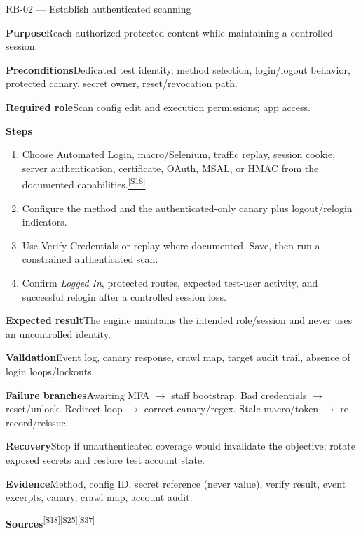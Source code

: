 \documentclass[11pt,letterpaper,oneside]{scrreprt}
\newcommand{\src}[1]{\hyperref[src:#1]{\textsuperscript{\color{R7Orange}[#1]}}}
\newcommand{\field}[1]{\par\smallskip\noindent\textbf{#1}\quad}
\begin{document}
\begin{procedure}{RB-02 --- Establish authenticated scanning}
\field{Purpose}Reach authorized protected content while maintaining a controlled session.
\field{Preconditions}Dedicated test identity, method selection, login/logout behavior, protected canary, secret owner, reset/revocation path.
\field{Required role}Scan config edit and execution permissions; app access.
\field{Steps}
\begin{enumerate}
  \item Choose Automated Login, macro/Selenium, traffic replay, session cookie, server authentication, certificate, OAuth, MSAL, or HMAC from the documented capabilities.\src{S18}
  \item Configure the method and the authenticated-only canary plus logout/relogin indicators.
  \item Use Verify Credentials or replay where documented. Save, then run a constrained authenticated scan.
  \item Confirm \emph{Logged In}, protected routes, expected test-user activity, and successful relogin after a controlled session loss.
\end{enumerate}
\field{Expected result}The engine maintains the intended role/session and never uses an uncontrolled identity.
\field{Validation}Event log, canary response, crawl map, target audit trail, absence of login loops/lockouts.
\field{Failure branches}Awaiting MFA $\rightarrow$ staff bootstrap. Bad credentials $\rightarrow$ reset/unlock. Redirect loop $\rightarrow$ correct canary/regex. Stale macro/token $\rightarrow$ re-record/reissue.
\field{Recovery}Stop if unauthenticated coverage would invalidate the objective; rotate exposed secrets and restore test account state.
\field{Evidence}Method, config ID, secret reference (never value), verify result, event excerpts, canary, crawl map, account audit.
\field{Sources}\src{S18}\src{S25}\src{S37}
\end{procedure}
\end{document}
